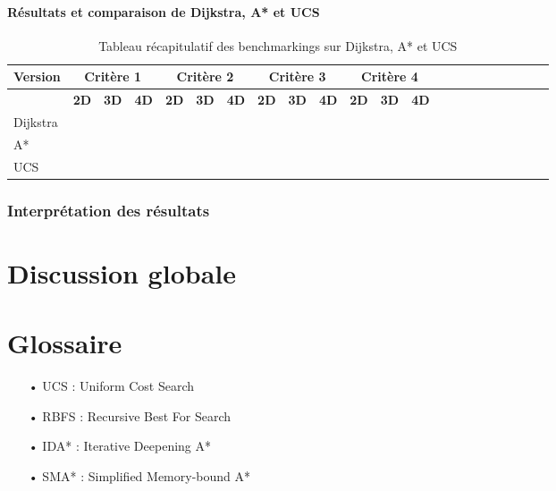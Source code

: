 \documentclass[pidr]{tnreport}
\begin{document}
		\subsubsection{Résultats et comparaison de Dijkstra, A* et UCS}
		
\begin{table}[h]
\begin{center}
   \begin{tabular}{| l | r | r | r | r | r | r | r | r | r | r | r | r | r | r | r | r | r | r | r | r | r |}
     \hline
      \textbf{Version} & \multicolumn{3}{c|}{\textbf{Critère 1}} & \multicolumn{3}{c|}{\textbf{Critère 2}} & \multicolumn{3}{c|}{\textbf{Critère 3}} & \multicolumn{3}{c|}{\textbf{Critère 4}} \\
     \hline
     \cline{2-5}
    & \textbf{2D} & \textbf{3D} & \textbf{4D} & \textbf{2D} & \textbf{3D} & \textbf{4D} & \textbf{2D} & \textbf{3D} & \textbf{4D} & \textbf{2D} & \textbf{3D} & \textbf{4D}\\ \hline
     Dijkstra &  &  &  &  &  &  & & &  & & & \\ \hline
     A* &  &  &  &  &  &  &  &  &  &  &  &   \\ \hline
      UCS &  &  &  &  &  &  &  &  &  &  &  &   \\ \hline
   \end{tabular}
 \end{center}
 \caption{Tableau récapitulatif des benchmarkings sur Dijkstra, A* et UCS}
\end{table}	
		
		\subsection{Interprétation des résultats}

\chapter{Discussion globale}

\clearpage
\renewcommand{\tocbibname}{Bibliographie / Webographie}


\clearpage

\chapter*{Glossaire}

\begin{itemize}
	\item[•] UCS : Uniform Cost Search
	\item[•] RBFS : Recursive Best For Search
	\item[•] IDA* : Iterative Deepening A*
	\item[•] SMA* : Simplified Memory-bound A*
\end{itemize}
\end{document}
